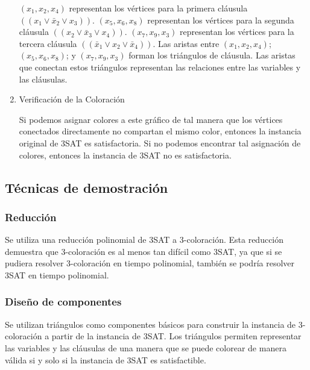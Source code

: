 \begin{enumerate}
    $(x_1 , x_2 , x_4)$ representan los vértices para la primera cláusula $((x_1 \vee \bar{x}_2 \vee x_3))$.
    $(x_5 , x_6 , x_8)$ representan los vértices para la segunda cláusula $((x_2 \vee \bar{x}_3 \vee x_4))$.
    $(x_7 , x_9 , x_3)$ representan los vértices para la tercera cláusula $((\bar{x}_1 \vee x_2 \vee \bar{x}_4))$.
    Las aristas entre $(x_1 , x_2 , x_4)$; $(x_5 , x_6 , x_8)$; y $(x_7 , x_9 , x_3)$ forman los triángulos de cláusula.
    Las aristas que conectan estos triángulos representan las relaciones entre las variables y las cláusulas.

    \item Verificación de la Coloración 
    
    Si podemos asignar colores a este gráfico de tal manera que los vértices conectados directamente 
    no compartan el mismo color, entonces la instancia original de 3SAT es satisfactoria. Si no podemos 
    encontrar tal asignación de colores, entonces la instancia de 3SAT no es satisfactoria.
\end{enumerate}


\subsection{\textcolor{Contraste4}{Técnicas de demostración}}
\subsubsection*{\textcolor{Contraste3}{Reducción}}

Se utiliza una reducción polinomial de 3SAT a 3-coloración. Esta reducción demuestra que 3-coloración 
es al menos tan difícil como 3SAT, ya que si se pudiera resolver 3-coloración en tiempo polinomial,
también se podría resolver 3SAT en tiempo polinomial.

\subsubsection*{\textcolor{Contraste3}{Diseño de componentes}}

Se utilizan triángulos como componentes básicos para construir la instancia de 3-coloración a partir de la 
instancia de 3SAT. Los triángulos permiten representar las variables y las cláusulas de una manera que se 
puede colorear de manera válida si y solo si la instancia de 3SAT es satisfactible.

